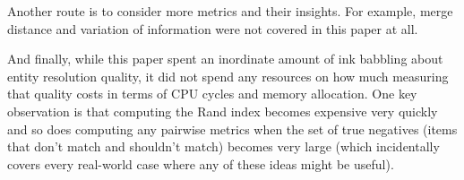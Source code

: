 \documentclass[11pt]{article}
\begin{document}
    Another route is to consider more metrics and their insights.
    For example, merge distance and variation of information were not covered in
    this paper at all.

    And finally, while this paper spent an inordinate amount of ink babbling
    about entity resolution quality, it did not spend any resources on how much
    measuring that quality costs in terms of CPU cycles and memory allocation.
    One key observation is that computing the Rand index becomes expensive very
    quickly and so does computing any pairwise metrics when the set of true
    negatives (items that don't match and shouldn't match) becomes very large
    (which incidentally covers every real-world case where any of these ideas
    might be useful).

    
\end{document}

